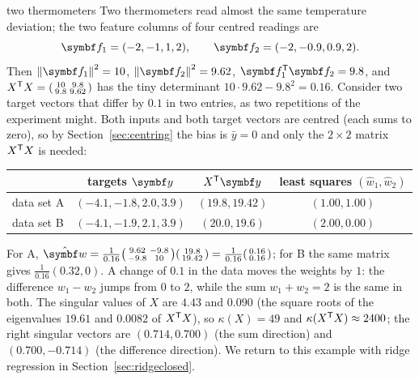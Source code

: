 \documentclass[11pt]{article}
\newcommand{\w}{\vect{w}}
\newcommand{\y}{\vect{y}}
\begin{document}
\begin{worked}{two thermometers}
Two thermometers read almost the same temperature deviation; the two feature columns of four centred readings are
\[
  \vect{f}_1 = (-2, -1, 1, 2), \qquad \vect{f}_2 = (-2, -0.9, 0.9, 2) .
\]
Then $\norm{\vect{f}_1}^2 = 10$, $\norm{\vect{f}_2}^2 = 9.62$, $\vect{f}_1\T\vect{f}_2 = 9.8$, and
$X^{\mathsf{T}} X = \begin{psmallmatrix} 10 & 9.8 \\ 9.8 & 9.62 \end{psmallmatrix}$ has the tiny determinant
$10 \cdot 9.62 - 9.8^2 = 0.16$. Consider two target vectors that differ by $0.1$ in two entries, as two repetitions of
the experiment might. Both inputs and both target vectors are centred (each sums to zero), so by
Section~\ref{sec:centring} the bias is $\bar y = 0$ and only the $2 \times 2$ matrix $X^{\mathsf{T}} X$ is needed:
\begin{center}\small
\begin{tabular}{lccc}
\toprule
 & targets $\y$ & $X\T\y$ & least squares $(\hat w_1, \hat w_2)$ \\
\midrule
data set A & $(-4.1, -1.8, 2.0, 3.9)$ & $(19.8, 19.42)$ & $(1.00, 1.00)$ \\
data set B & $(-4.1, -1.9, 2.1, 3.9)$ & $(20.0, 19.6)$ & $(2.00, 0.00)$ \\
\bottomrule
\end{tabular}
\end{center}
For A, $\hat{\w} = \frac{1}{0.16}\begin{psmallmatrix} 9.62 & -9.8 \\ -9.8 & 10 \end{psmallmatrix}
\begin{psmallmatrix} 19.8 \\ 19.42 \end{psmallmatrix} = \frac{1}{0.16}\begin{psmallmatrix} 0.16 \\ 0.16
\end{psmallmatrix}$; for B the same matrix gives $\frac{1}{0.16}(0.32, 0)$. A change of $0.1$ in the data moves the weights
by $1$: the difference $w_1 - w_2$ jumps from $0$ to $2$, while the sum $w_1 + w_2 = 2$ is the same in both. The singular
values of $X$ are $4.43$ and $0.090$ (the square roots of the eigenvalues $19.61$ and $0.0082$ of $X^{\mathsf{T}} X$), so $\kappa(X) = 49$ and $\kappa(X^{\mathsf{T}} X) \approx 2400$; the right singular vectors
are $(0.714, 0.700)$ (the sum direction) and $(0.700, -0.714)$ (the difference direction). We return to this example
with ridge regression in Section~\ref{sec:ridgeclosed}.
\end{worked}
\end{document}
